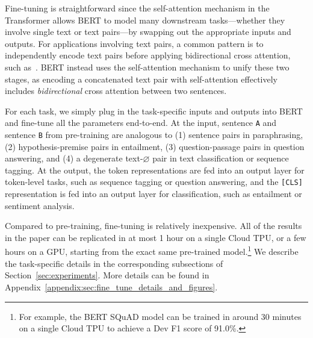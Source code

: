 Fine-tuning is straightforward since the self-attention mechanism in the Transformer allows BERT to model many downstream tasks---whether they involve single text or text pairs---by swapping out the appropriate inputs and outputs.
For applications involving text pairs, a common pattern is to independently encode text pairs before applying bidirectional cross attention, such as~. BERT instead uses the self-attention mechanism to unify these two stages, as encoding 
a concatenated text pair with self-attention effectively includes \emph{bidirectional} cross attention between two sentences. 


For each task, we simply plug in the task-specific inputs and outputs into BERT and fine-tune all the parameters end-to-end. 
%
At the input, sentence {\tt A} and sentence {\tt B} from pre-training are analogous to (1) sentence pairs in paraphrasing, (2) hypothesis-premise pairs in entailment, (3) question-passage pairs in question answering, and (4) a degenerate text-$\varnothing$ pair in text classification or sequence tagging. At the output, the token representations are fed into an output layer for token-level tasks, such as sequence tagging or question answering, and the {\tt [CLS]} representation is fed into an output layer for classification, such as entailment or sentiment analysis.


Compared to pre-training, fine-tuning is relatively inexpensive. All of the results in the paper can be replicated in at most 1 hour on a single Cloud TPU, or a few hours on a GPU, starting from the exact same pre-trained model.\footnote{For example, the BERT SQuAD model can be trained in around 30 minutes on a single Cloud TPU to achieve a Dev F1 score of 91.0\%.}
We describe the task-specific details in the corresponding subsections of Section~\ref{sec:experiments}. 
More details can be found in Appendix~\ref{appendix:sec:fine_tune_details_and_figures}.


